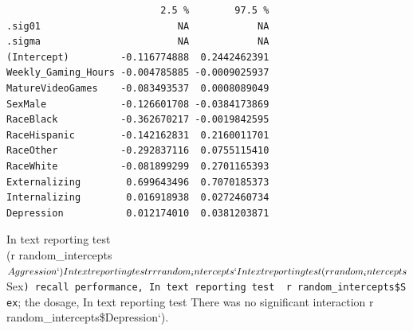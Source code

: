 \documentclass{article}
\begin{document}
\begin{verbatim}
                           2.5 %        97.5 %
.sig01                        NA            NA
.sigma                        NA            NA
(Intercept)         -0.116774888  0.2442462391
Weekly_Gaming_Hours -0.004785885 -0.0009025937
MatureVideoGames    -0.083493537  0.0008089049
SexMale             -0.126601708 -0.0384173869
RaceBlack           -0.362670217 -0.0019842595
RaceHispanic        -0.142162831  0.2160011701
RaceOther           -0.292837116  0.0755115410
RaceWhite           -0.081899299  0.2701165393
Externalizing        0.699643496  0.7070185373
Internalizing        0.016918938  0.0272460734
Depression           0.012174010  0.0381203871
\end{verbatim}

In text reporting test\\
(r
random\_intercepts\(Aggression`) In text reporting test r rrandom_intercepts` In text reporting test (r random_intercepts\)Sex\texttt{)\ recall\ performance,\ In\ text\ reporting\ test\ \ r\ random\_intercepts\$Sex};
the dosage, In text reporting test There was no significant interaction
r random\_intercepts\$Depression`).
\end{document}
